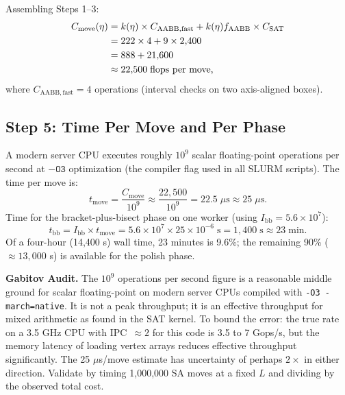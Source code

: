 \documentclass[11pt,oneside]{article}
\newcommand{\gabitov}[1]{\begin{gabitovbox}\textbf{Gabitov Audit.} #1\end{gabitovbox}}
\begin{document}
Assembling Steps 1--3:
\begin{align}
  C_{\mathrm{move}}(\eta)
  &= k(\eta) \times C_{\mathrm{AABB,fast}}
   + k(\eta) f_{\mathrm{AABB}} \times C_{\mathrm{SAT}} \notag \\
  &= 222 \times 4 + 9 \times 2{,}400 \notag \\
  &= 888 + 21{,}600 \notag \\
  &\approx 22{,}500 \;\text{flops per move,}
  \label{eq:cmove}
\end{align}
where $C_{\mathrm{AABB,fast}} = 4$ operations (interval checks on two
axis-aligned boxes).

\subsection{Step 5: Time Per Move and Per Phase}

A modern server CPU executes roughly $10^9$ scalar floating-point
operations per second at $-\mathtt{O3}$ optimization (the compiler
flag used in all SLURM scripts). The time per move is:
\begin{equation}
  t_{\mathrm{move}} = \frac{C_{\mathrm{move}}}{10^9} \approx
  \frac{22{,}500}{10^9} = 22.5\;\mu\mathrm{s} \approx 25\;\mu\mathrm{s}.
  \label{eq:tmove}
\end{equation}
Time for the bracket-plus-bisect phase on one worker (using $I_{\mathrm{bb}}
= 5.6 \times 10^7$):
\begin{equation}
  t_{\mathrm{bb}} = I_{\mathrm{bb}} \times t_{\mathrm{move}}
  = 5.6 \times 10^7 \times 25 \times 10^{-6}\;\mathrm{s}
  = 1{,}400\;\mathrm{s} \approx 23\;\mathrm{min.}
  \label{eq:tbb}
\end{equation}
Of a four-hour (14{,}400 s) wall time, 23 minutes is 9.6\%; the
remaining 90\% ($\approx 13{,}000$ s) is available for the polish phase.

\gabitov{%
The $10^9$ operations per second figure is a reasonable middle ground
for scalar floating-point on modern server CPUs compiled with
\texttt{-O3 -march=native}. It is not a peak throughput; it is an
effective throughput for mixed arithmetic as found in the SAT kernel.
To bound the error: the true rate on a 3.5 GHz CPU with IPC~$\approx
2$ for this code is 3.5 to 7 Gops/s, but the memory latency of loading
vertex arrays reduces effective throughput significantly. The 25
$\mu$s/move estimate has uncertainty of perhaps $2\times$ in either
direction. Validate by timing 1{,}000{,}000 SA moves at a fixed $L$
and dividing by the observed total cost.%
}
\end{document}
